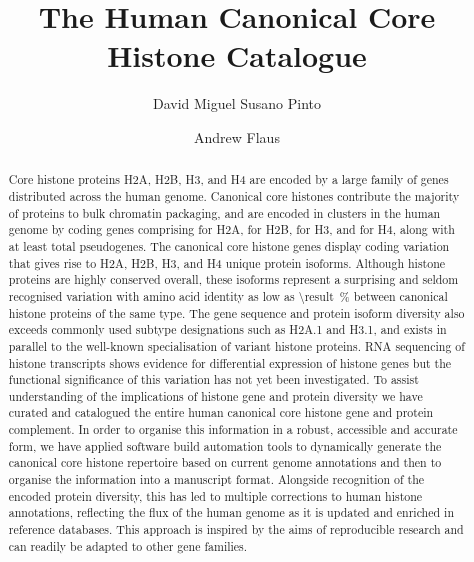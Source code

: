 \documentclass[a4paper,oneside,onecolumn,article,draft]{memoir}
\author{David Miguel Susano Pinto}
\author{Andrew Flaus}
\affil{Centre for Chromosome Biology, School of Natural Sciences, NUI Galway, Ireland.}
\title{The Human Canonical Core Histone Catalogue}
\begin{document}
  \maketitle

  \begin{abstract}
    Core histone proteins H2A, H2B, H3, and H4 are encoded
    by a large family of genes distributed across the human genome.
    Canonical core histones contribute the majority of proteins to bulk
    chromatin packaging,
    and are encoded in \NumberOfClusters{} clusters in the human genome
    by \TotalCoreCodingGenes{} coding genes comprising
    \HTwoACodingGenes{} for H2A,
    \HTwoBCodingGenes{} for H2B,
    \HThreeCodingGenes{} for H3,
    and \HFourCodingGenes{} for H4,
    along with at least \TotalCorePseudoGenes{} total pseudogenes.
    The canonical core histone genes display coding variation that gives rise to
    \HTwoAUniqueProteins{} H2A, \HTwoBUniqueProteins{} H2B,
    \HThreeUniqueProteins{} H3, and \HFourUniqueProteins{} H4 unique protein isoforms.
    Although histone proteins are highly conserved overall, 
    these isoforms represent a surprising and seldom recognised variation
    with amino acid identity as low as
     \SI{\result}{\percent}
    between canonical histone proteins of the same type.
    The gene sequence and protein isoform diversity
    also exceeds commonly used subtype designations such as H2A.1 and H3.1,
    and exists in parallel to the well-known specialisation of variant histone proteins.
    RNA sequencing of histone transcripts shows evidence for 
    differential expression of histone genes 
    but the functional significance of this variation has not yet been investigated.
    To assist understanding of the implications of histone gene and protein diversity
    we have curated and catalogued the entire human canonical core
    histone gene and protein complement.
    In order to organise this information in a
    robust, accessible and accurate form,
    we have applied software build automation tools to
    dynamically generate the canonical core histone repertoire
    based on current genome annotations
    and then to organise the information into a manuscript format.
    Alongside recognition of the encoded protein diversity,
    this has led to multiple corrections to human histone annotations,
    reflecting the flux of the human genome as it is updated and
    enriched in reference databases.
    This approach is inspired by the aims of reproducible research
    and can readily be adapted to other gene families.
  \end{abstract}
\end{document}
